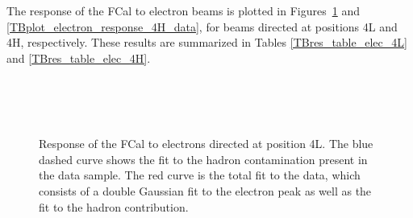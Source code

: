 The response of the FCal to electron beams is plotted in Figures~\ref{TBplot_electron_response_4L_data} and \ref{TBplot_electron_response_4H_data}, for beams directed at positions 4L and 4H, respectively. These results are summarized in Tables \ref{TBres_table_elec_4L} and \ref{TBres_table_elec_4H}. 
\begin{figure}[p]
\begin{center}
\\
\\
\\
\end{center}
\caption{Response of the FCal to electrons directed at position 4L. The blue dashed curve shows the fit to the hadron contamination present in the data sample. The red curve is the total fit to the data, which consists of a double Gaussian fit to the electron peak as well as the fit to the hadron contribution.}
\label{TBplot_electron_response_4L_data}
\end{figure}








